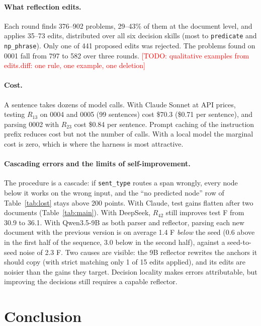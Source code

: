 \documentclass[11pt]{article}
\newcommand{\skill}[1]{\texttt{#1}}
\newcommand{\todo}[1]{\textcolor{red}{[TODO: #1]}}
\begin{document}
\paragraph{What reflection edits.}
Each round finds 376--902 problems, 29--43\% of them at the document level, and applies 35--73 edits, distributed over all six decision skills (most to \skill{predicate} and \skill{np\_phrase}). Only one of 441 proposed edits was rejected. The problems found on 0001 fall from 797 to 582 over three rounds. \todo{qualitative examples from edits.diff: one rule, one example, one deletion}

\paragraph{Cost.}
A sentence takes dozens of model calls. With Claude Sonnet at API prices, testing $R_{13}$ on 0004 and 0005 (99 sentences) cost \$70.3 (\$0.71 per sentence), and parsing 0002 with $R_{23}$ cost \$0.84 per sentence. Prompt caching of the instruction prefix reduces cost but not the number of calls. With a local model the marginal cost is zero, which is where the harness is most attractive.

\paragraph{Cascading errors and the limits of self-improvement.}
The procedure is a cascade: if \skill{sent\_type} routes a span wrongly, every node below it works on the wrong input, and the ``no predicted node'' row of Table~\ref{tab:lost} stays above 200 points. With Claude, test gains flatten after two documents (Table~\ref{tab:main}). With DeepSeek, $R_{42}$ still improves test F from 30.9 to 36.1. With Qwen3.5-9B as both parser and reflector, parsing each new document with the previous version is on average 1.4 F \emph{below} the seed (0.6 above in the first half of the sequence, 3.0 below in the second half), against a seed-to-seed noise of 2.3 F. Two causes are visible: the 9B reflector rewrites the anchors it should copy (with strict matching only 1 of 15 edits applied), and its edits are noisier than the gains they target. Decision locality makes errors attributable, but improving the decisions still requires a capable reflector.

\section{Conclusion}
\end{document}
